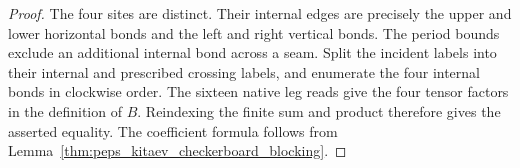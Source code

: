 \begin{proof}\leanok
    The four sites are distinct. Their internal edges are precisely the
    upper and lower horizontal bonds and the left and right vertical bonds.
    The period bounds exclude an additional internal bond across a seam.
    Split the incident labels into their internal and prescribed crossing
    labels, and enumerate the four internal bonds in clockwise order.
    The sixteen native leg reads give the four tensor factors in the
    definition of $B$. Reindexing the finite sum and product therefore gives
    the asserted equality. The coefficient formula follows from
    Lemma~\ref{thm:peps_kitaev_checkerboard_blocking}.
\end{proof}
